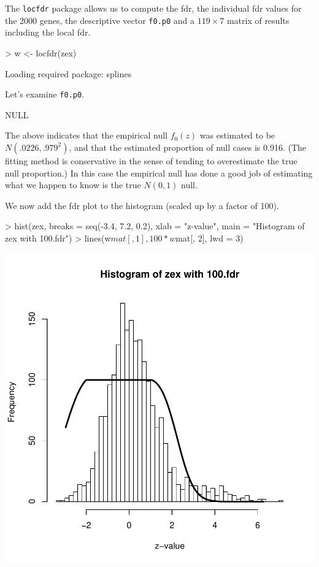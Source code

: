 \documentclass[11pt]{article}
\begin{document}
The \texttt{locfdr} package allows us to compute the fdr, the
individual fdr values for the 2000 genes, the descriptive vector
\texttt{f0.p0} and a $119\times 7$ matrix of results including the
local fdr. 

\begin{Schunk}
\begin{Sinput}
> w <- locfdr(zex)
\end{Sinput}
\begin{Soutput}
Loading required package: splines 
\end{Soutput}
\end{Schunk}

Let's examine \texttt{f0.p0}. 

\begin{Schunk}
\begin{Soutput}
NULL
\end{Soutput}
\end{Schunk}

The above indicates that the empirical null $f_0(z)$ was estimated to
be $N(.0226,.979^2)$, and that the estimated proportion of null cases
is 0.916. (The fitting method is conservative in the sense of tending
to overestimate the true null proportion.) In this case the empirical
null has done a good job of estimating what we happen to know is the
true $N(0,1)$ null.

We now add the fdr plot to the histogram (scaled up by a factor of
100).

\begin{Schunk}
\begin{Sinput}
> hist(zex, breaks = seq(-3.4, 7.2, 0.2), xlab = "z-value", main = "Histogram of zex with 100.fdr")
> lines(w$mat[, 1], 100 * w$mat[, 2], lwd = 3)
\end{Sinput}
\end{Schunk}
\includegraphics{locfdr-example-FDR-Plot}
\end{document}
